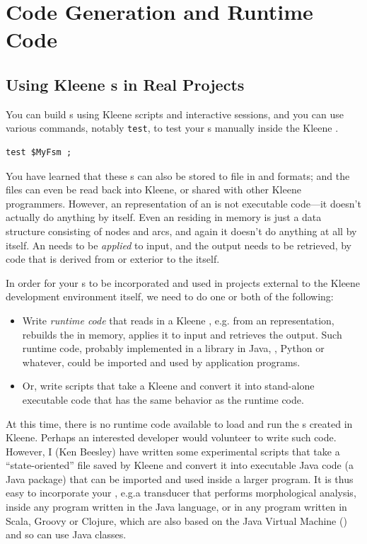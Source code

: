 \chapter{Code Generation and Runtime Code}

\label{chapt:coderuntime}

\section{Using Kleene \fsm{}s in Real Projects}

 
You can build \fsm{}s using Kleene scripts and interactive  sessions,
and you can
use various commands, notably \texttt{test}, to 
test your \fsm{}s manually inside the Kleene .


\begin{Verbatim}
test $MyFsm ;
\end{Verbatim}

\noindent
You have learned that these \fsm{}s can also be stored to file in  and \xml{}
formats; and the \xml{} files can even be read back into Kleene, or shared with other
Kleene programmers.  However, an  representation of
an \fsm{} is not executable code---it doesn't actually do anything by itself.  Even an
\fsm{} residing in memory is just a data structure consisting of nodes and arcs, and again it
doesn't do anything at all by itself.  An \fsm{} needs to be \emph{applied} to input, and
the output needs to be retrieved, by code that is derived from or exterior to the \fsm{} itself.

In order for your \fsm{}s to
be incorporated and used in projects external to the Kleene development environment itself,
we need to do one or both of the following:

\begin{itemize}
\item
Write \emph{runtime code} that reads in a Kleene \fsm{}, e.g.\@
from an  representation, 
rebuilds the \fsm{} in memory, applies it to input and retrieves the output.
Such runtime code, probably implemented in a library in Java, \CPP{}, Python or whatever, could be
imported and used by application programs.
\item
Or, write scripts that take a Kleene \fsm{} and convert it into stand-alone
executable code that has the same behavior as the runtime code.
\end{itemize}

At this time, there is no runtime code available to load and run the \fsm{}s created
in Kleene.  Perhaps an interested developer would volunteer to write such code.  However, I (Ken
Beesley) have written some experimental  scripts that take a ``state-oriented''
 file saved by Kleene and convert it into executable Java code (a Java package)
that can be imported
and used inside a larger program.  It is thus easy to incorporate your \fsm{}, e.g.\@ a
transducer that performs morphological analysis, inside any program written in the Java language,
or in any program written in Scala, Groovy or Clojure, which are also based on the Java Virtual Machine
() and so can use Java classes.

